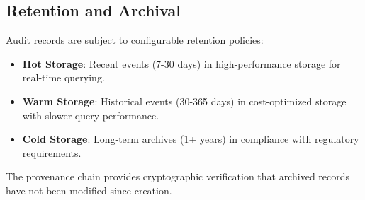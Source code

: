\subsection{Retention and Archival}
\label{subsec:audit-retention}

Audit records are subject to configurable retention policies:

\begin{itemize}
    \item \textbf{Hot Storage}: Recent events (7-30 days) in high-performance storage for real-time querying.
    \item \textbf{Warm Storage}: Historical events (30-365 days) in cost-optimized storage with slower query performance.
    \item \textbf{Cold Storage}: Long-term archives (1+ years) in compliance with regulatory requirements.
\end{itemize}

The provenance chain provides cryptographic verification that archived records have not been modified since creation.

